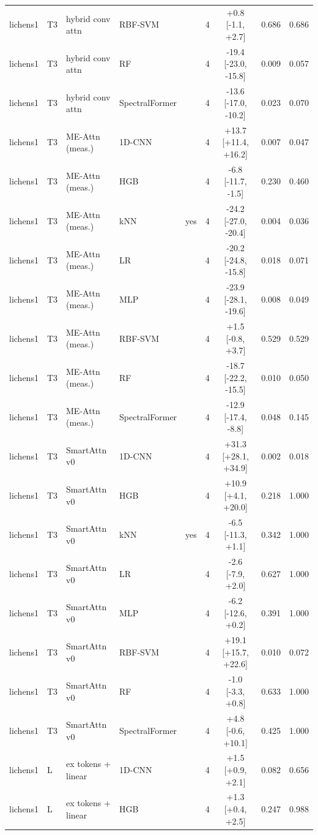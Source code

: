 \begin{tabular}{lllllcccc}
lichens1 & T3 & hybrid conv attn & RBF-SVM &  & 4 & +0.8 [-1.1, +2.7] & 0.686 & 0.686 \\
lichens1 & T3 & hybrid conv attn & RF &  & 4 & -19.4 [-23.0, -15.8] & 0.009 & 0.057 \\
lichens1 & T3 & hybrid conv attn & SpectralFormer &  & 4 & -13.6 [-17.0, -10.2] & 0.023 & 0.070 \\
lichens1 & T3 & ME-Attn (meas.) & 1D-CNN &  & 4 & +13.7 [+11.4, +16.2] & 0.007 & 0.047 \\
lichens1 & T3 & ME-Attn (meas.) & HGB &  & 4 & -6.8 [-11.7, -1.5] & 0.230 & 0.460 \\
lichens1 & T3 & ME-Attn (meas.) & kNN & yes & 4 & -24.2 [-27.0, -20.4] & 0.004 & 0.036 \\
lichens1 & T3 & ME-Attn (meas.) & LR &  & 4 & -20.2 [-24.8, -15.8] & 0.018 & 0.071 \\
lichens1 & T3 & ME-Attn (meas.) & MLP &  & 4 & -23.9 [-28.1, -19.6] & 0.008 & 0.049 \\
lichens1 & T3 & ME-Attn (meas.) & RBF-SVM &  & 4 & +1.5 [-0.8, +3.7] & 0.529 & 0.529 \\
lichens1 & T3 & ME-Attn (meas.) & RF &  & 4 & -18.7 [-22.2, -15.5] & 0.010 & 0.050 \\
lichens1 & T3 & ME-Attn (meas.) & SpectralFormer &  & 4 & -12.9 [-17.4, -8.8] & 0.048 & 0.145 \\
lichens1 & T3 & SmartAttn v0 & 1D-CNN &  & 4 & +31.3 [+28.1, +34.9] & 0.002 & 0.018 \\
lichens1 & T3 & SmartAttn v0 & HGB &  & 4 & +10.9 [+4.1, +20.0] & 0.218 & 1.000 \\
lichens1 & T3 & SmartAttn v0 & kNN & yes & 4 & -6.5 [-11.3, +1.1] & 0.342 & 1.000 \\
lichens1 & T3 & SmartAttn v0 & LR &  & 4 & -2.6 [-7.9, +2.0] & 0.627 & 1.000 \\
lichens1 & T3 & SmartAttn v0 & MLP &  & 4 & -6.2 [-12.6, +0.2] & 0.391 & 1.000 \\
lichens1 & T3 & SmartAttn v0 & RBF-SVM &  & 4 & +19.1 [+15.7, +22.6] & 0.010 & 0.072 \\
lichens1 & T3 & SmartAttn v0 & RF &  & 4 & -1.0 [-3.3, +0.8] & 0.633 & 1.000 \\
lichens1 & T3 & SmartAttn v0 & SpectralFormer &  & 4 & +4.8 [-0.6, +10.1] & 0.425 & 1.000 \\
lichens1 & L & ex tokens + linear & 1D-CNN &  & 4 & +1.5 [+0.9, +2.1] & 0.082 & 0.656 \\
lichens1 & L & ex tokens + linear & HGB &  & 4 & +1.3 [+0.4, +2.5] & 0.247 & 0.988 \\

\end{tabular}
